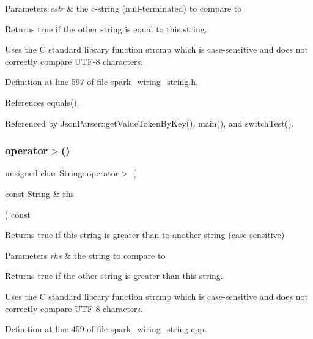 \begin{DoxyParams}{Parameters}
{\em cstr} & the c-\/string (null-\/terminated) to compare to\\
\hline
\end{DoxyParams}
\begin{DoxyReturn}{Returns}
true if the other string is equal to this string.
\end{DoxyReturn}
Uses the C standard library function strcmp which is case-\/sensitive and does not correctly compare U\+T\+F-\/8 characters. 

Definition at line 597 of file spark\+\_\+wiring\+\_\+string.\+h.



References equals().



Referenced by Json\+Parser\+::get\+Value\+Token\+By\+Key(), main(), and switch\+Test().

\mbox{\label{class_string_a25bbbdda663b6b0eb3ed3458e80fc66e}} 
\subsubsection{\texorpdfstring{operator$>$()}{operator>()}}
{\footnotesize\ttfamily unsigned char String\+::operator$>$ (\begin{DoxyParamCaption}\item[{const \hyperlink{class_string}{String} \&}]{rhs }\end{DoxyParamCaption}) const}



Returns true if this string is greater than to another string (case-\/sensitive) 


\begin{DoxyParams}{Parameters}
{\em rhs} & the string to compare to\\
\hline
\end{DoxyParams}
\begin{DoxyReturn}{Returns}
true if the other string is greater than this string.
\end{DoxyReturn}
Uses the C standard library function strcmp which is case-\/sensitive and does not correctly compare U\+T\+F-\/8 characters. 

Definition at line 459 of file spark\+\_\+wiring\+\_\+string.\+cpp.




